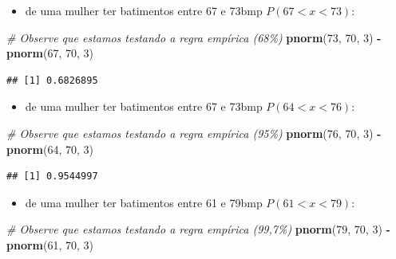 \documentclass[
]{book}
\newenvironment{Shaded}{\begin{snugshade}}{\end{snugshade}}
\newcommand{\CommentTok}[1]{\textcolor[rgb]{0.56,0.35,0.01}{\textit{#1}}}
\newcommand{\DecValTok}[1]{\textcolor[rgb]{0.00,0.00,0.81}{#1}}
\newcommand{\FunctionTok}[1]{\textcolor[rgb]{0.13,0.29,0.53}{\textbf{#1}}}
\newcommand{\NormalTok}[1]{#1}
\newcommand{\SpecialCharTok}[1]{\textcolor[rgb]{0.81,0.36,0.00}{\textbf{#1}}}
\providecommand{\tightlist}{%
  \setlength{\itemsep}{0pt}\setlength{\parskip}{0pt}}
\begin{document}
\begin{itemize}
\tightlist
\item
  de uma mulher ter batimentos entre 67 e 73bmp \(P(67 < x < 73)\):
\end{itemize}

\begin{Shaded}
\begin{Highlighting}[]
\CommentTok{\# Observe que estamos testando a regra empírica (68\%)}
\FunctionTok{pnorm}\NormalTok{(}\DecValTok{73}\NormalTok{, }\DecValTok{70}\NormalTok{, }\DecValTok{3}\NormalTok{) }\SpecialCharTok{{-}} \FunctionTok{pnorm}\NormalTok{(}\DecValTok{67}\NormalTok{, }\DecValTok{70}\NormalTok{, }\DecValTok{3}\NormalTok{)}
\end{Highlighting}
\end{Shaded}

\begin{verbatim}
## [1] 0.6826895
\end{verbatim}

\begin{itemize}
\tightlist
\item
  de uma mulher ter batimentos entre 67 e 73bmp \(P(64 < x < 76)\):
\end{itemize}

\begin{Shaded}
\begin{Highlighting}[]
\CommentTok{\# Observe que estamos testando a regra empírica (95\%)}
\FunctionTok{pnorm}\NormalTok{(}\DecValTok{76}\NormalTok{, }\DecValTok{70}\NormalTok{, }\DecValTok{3}\NormalTok{) }\SpecialCharTok{{-}} \FunctionTok{pnorm}\NormalTok{(}\DecValTok{64}\NormalTok{, }\DecValTok{70}\NormalTok{, }\DecValTok{3}\NormalTok{)}
\end{Highlighting}
\end{Shaded}

\begin{verbatim}
## [1] 0.9544997
\end{verbatim}

\begin{itemize}
\tightlist
\item
  de uma mulher ter batimentos entre 61 e 79bmp \(P(61 < x < 79)\):
\end{itemize}

\begin{Shaded}
\begin{Highlighting}[]
\CommentTok{\# Observe que estamos testando a regra empírica (99,7\%)}
\FunctionTok{pnorm}\NormalTok{(}\DecValTok{79}\NormalTok{, }\DecValTok{70}\NormalTok{, }\DecValTok{3}\NormalTok{) }\SpecialCharTok{{-}} \FunctionTok{pnorm}\NormalTok{(}\DecValTok{61}\NormalTok{, }\DecValTok{70}\NormalTok{, }\DecValTok{3}\NormalTok{)}
\end{Highlighting}
\end{Shaded}
\end{document}
